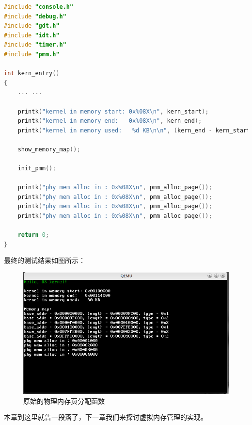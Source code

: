 \begin{lstlisting}[language = C, caption = init/entry.c]
#include "console.h"
#include "debug.h"
#include "gdt.h"
#include "idt.h"
#include "timer.h"
#include "pmm.h"

int kern_entry()
{
	... ...

	printk("kernel in memory start: 0x%08X\n", kern_start);
	printk("kernel in memory end:   0x%08X\n", kern_end);
	printk("kernel in memory used:   %d KB\n\n", (kern_end - kern_start + 1023) / 1024);
	
	show_memory_map();

	init_pmm();

	printk("phy mem alloc in : 0x%08X\n", pmm_alloc_page());
	printk("phy mem alloc in : 0x%08X\n", pmm_alloc_page());
	printk("phy mem alloc in : 0x%08X\n", pmm_alloc_page());
	printk("phy mem alloc in : 0x%08X\n", pmm_alloc_page());

	return 0;
}
\end{lstlisting}

\par 最终的测试结果如图所示：

\begin{figure}[H]
      \centering
      \includegraphics[scale=0.6]{picture/chapt9/PHY_MEM_ALLOC.png}
      \caption{原始的物理内存页分配函数}
\end{figure}

\par 本章到这里就告一段落了，下一章我们来探讨虚拟内存管理的实现。

